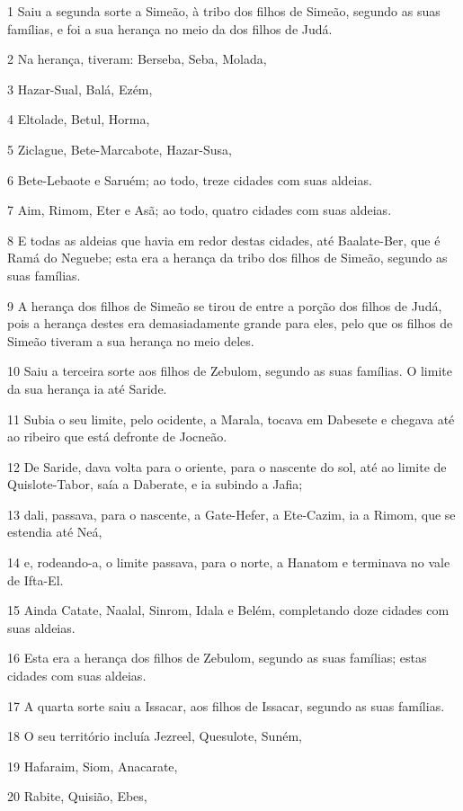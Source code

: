 \par 1 Saiu a segunda sorte a Simeão, à tribo dos filhos de Simeão, segundo as suas famílias, e foi a sua herança no meio da dos filhos de Judá.
\par 2 Na herança, tiveram: Berseba, Seba, Molada,
\par 3 Hazar-Sual, Balá, Ezém,
\par 4 Eltolade, Betul, Horma,
\par 5 Ziclague, Bete-Marcabote, Hazar-Susa,
\par 6 Bete-Lebaote e Saruém; ao todo, treze cidades com suas aldeias.
\par 7 Aim, Rimom, Eter e Asã; ao todo, quatro cidades com suas aldeias.
\par 8 E todas as aldeias que havia em redor destas cidades, até Baalate-Ber, que é Ramá do Neguebe; esta era a herança da tribo dos filhos de Simeão, segundo as suas famílias.
\par 9 A herança dos filhos de Simeão se tirou de entre a porção dos filhos de Judá, pois a herança destes era demasiadamente grande para eles, pelo que os filhos de Simeão tiveram a sua herança no meio deles.
\par 10 Saiu a terceira sorte aos filhos de Zebulom, segundo as suas famílias. O limite da sua herança ia até Saride.
\par 11 Subia o seu limite, pelo ocidente, a Marala, tocava em Dabesete e chegava até ao ribeiro que está defronte de Jocneão.
\par 12 De Saride, dava volta para o oriente, para o nascente do sol, até ao limite de Quislote-Tabor, saía a Daberate, e ia subindo a Jafia;
\par 13 dali, passava, para o nascente, a Gate-Hefer, a Ete-Cazim, ia a Rimom, que se estendia até Neá,
\par 14 e, rodeando-a, o limite passava, para o norte, a Hanatom e terminava no vale de Ifta-El.
\par 15 Ainda Catate, Naalal, Sinrom, Idala e Belém, completando doze cidades com suas aldeias.
\par 16 Esta era a herança dos filhos de Zebulom, segundo as suas famílias; estas cidades com suas aldeias.
\par 17 A quarta sorte saiu a Issacar, aos filhos de Issacar, segundo as suas famílias.
\par 18 O seu território incluía Jezreel, Quesulote, Suném,
\par 19 Hafaraim, Siom, Anacarate,
\par 20 Rabite, Quisião, Ebes,

